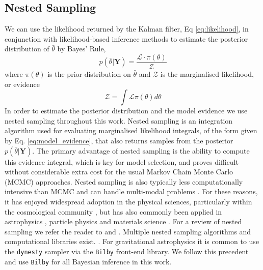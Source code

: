 \documentclass[fleqn,usenatbib,useAMS]{mnras}
\begin{document}
\subsection{Nested Sampling}\label{sec:nested_sampling}

We can use the likelihood returned by the Kalman filter, Eq \ref{eq:likelihood}, in conjunction with likelihood-based inference methods to estimate the posterior distribution of $\bar{\theta}$ by Bayes' Rule,
\begin{equation}
	p(\bar{\theta} | \boldsymbol{Y}) = \frac{\mathcal{L} \cdot \pi(\theta)}{\mathcal{Z}}
\end{equation}
where $\pi(\theta)$ is the prior distribution on $\bar{\theta}$ and $\mathcal{Z}$ is the marginalised likelihood, or evidence
\begin{equation}
	\mathcal{Z} = \int \mathcal{L} \pi (\theta) d \theta \label{eq:model_evidence}
\end{equation}
In order to estimate the posterior distribution and the model evidence we use nested sampling \citep[NS,][]{Skilling} throughout this work. Nested sampling is an integration algorithm used for evaluating marginalised likelihood integrals, of the form given by Eq. \ref{eq:model_evidence}, that also returns samples from the posterior $p(\bar{\theta} | \boldsymbol{Y})$. The primary advantage of nested sampling is the ability to compute this evidence integral, which is key for model selection, and proves difficult without considerable extra cost for the usual Markov Chain Monte Carlo (MCMC) approaches. Nested sampling is also typically less computationally intensive than MCMC and can handle multi-modal problems \citep{Ashton2022}. For these reasons, it has enjoyed widespread adoption in the physical sciences, particularly within the cosmological community \citep{Mukherjee2006,Feroz2008,Handley2015}, but has also commonly been applied in astrophysics \citep{UltraNest2021}, particle physics \citep{proceedings2019033014} and materials science \citep{2009arXiv0906materials}. For a review of nested sampling we refer the reader to \cite{Buchner2021} and \cite{Ashton2022}. Multiple nested sampling algorithms and computational libraries exist. \citep[e.g.][]{Feroz2008,Feroz2009,Handley2015,dynesty2020,UltraNest2021}. For gravitational astrophysics it is common to use the \texttt{dynesty} sampler \citep{dynesty2020} via the \texttt{Bilby} \cite{bilby.507.2037A} front-end library. We  follow this precedent and use \texttt{Bilby} for all Bayesian inference in this work.
\end{document}
